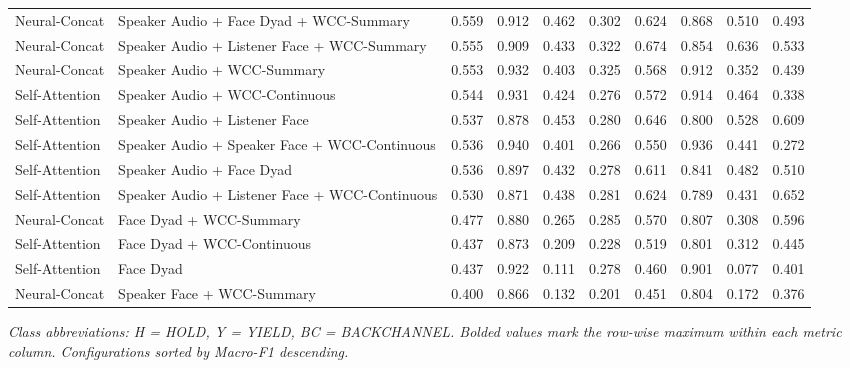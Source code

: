 \begin{table}[h]
{\begin{tabular}{l l c @{\hspace{6pt}} ccc @{\hspace{12pt}} c @{\hspace{6pt}} ccc}
Neural-Concat & Speaker Audio + Face Dyad + WCC-Summary & 0.559 & 0.912 & 0.462 & 0.302 & 0.624 & 0.868 & 0.510 & 0.493 \\
Neural-Concat & Speaker Audio + Listener Face + WCC-Summary & 0.555 & 0.909 & 0.433 & 0.322 & 0.674 & 0.854 & 0.636 & 0.533 \\
Neural-Concat & Speaker Audio + WCC-Summary & 0.553 & 0.932 & 0.403 & 0.325 & 0.568 & 0.912 & 0.352 & 0.439 \\
Self-Attention & Speaker Audio + WCC-Continuous & 0.544 & 0.931 & 0.424 & 0.276 & 0.572 & 0.914 & 0.464 & 0.338 \\
Self-Attention & Speaker Audio + Listener Face & 0.537 & 0.878 & 0.453 & 0.280 & 0.646 & 0.800 & 0.528 & 0.609 \\
Self-Attention & Speaker Audio + Speaker Face + WCC-Continuous & 0.536 & 0.940 & 0.401 & 0.266 & 0.550 & 0.936 & 0.441 & 0.272 \\
Self-Attention & Speaker Audio + Face Dyad & 0.536 & 0.897 & 0.432 & 0.278 & 0.611 & 0.841 & 0.482 & 0.510 \\
Self-Attention & Speaker Audio + Listener Face + WCC-Continuous & 0.530 & 0.871 & 0.438 & 0.281 & 0.624 & 0.789 & 0.431 & 0.652 \\
Neural-Concat & Face Dyad + WCC-Summary & 0.477 & 0.880 & 0.265 & 0.285 & 0.570 & 0.807 & 0.308 & 0.596 \\
Self-Attention & Face Dyad + WCC-Continuous & 0.437 & 0.873 & 0.209 & 0.228 & 0.519 & 0.801 & 0.312 & 0.445 \\
Self-Attention & Face Dyad & 0.437 & 0.922 & 0.111 & 0.278 & 0.460 & 0.901 & 0.077 & 0.401 \\
Neural-Concat & Speaker Face + WCC-Summary & 0.400 & 0.866 & 0.132 & 0.201 & 0.451 & 0.804 & 0.172 & 0.376 \\
\bottomrule
\end{tabular}%
}
\par\vspace{2pt}
\noindent\footnotesize\textit{Class abbreviations: H = HOLD, Y = YIELD, BC = BACKCHANNEL. Bolded values mark the row-wise maximum within each metric column. Configurations sorted by Macro-F1 descending.}
\end{table}
